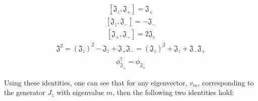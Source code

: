 \documentclass[10pt]{ucthesis}
\begin{document}
\begin{equation}
	\begin{aligned}
		[\mathfrak{J}_z,\mathfrak{J}_+] = \mathfrak{J}_+
	\end{aligned}
\end{equation} 
\begin{equation}
	\begin{aligned}
		[\mathfrak{J}_z,\mathfrak{J}_-] = -\mathfrak{J}_-
	\end{aligned}
\end{equation} 
\begin{equation}
	\begin{aligned}
		[\mathfrak{J}_+,\mathfrak{J}_-] = 2\mathfrak{J}_z
	\end{aligned}
\end{equation} 
\begin{equation}
	\begin{aligned}
		\mathfrak{J}^2 = (\mathfrak{J}_z)^2  -\mathfrak{J}_z +\mathfrak{J}_+\mathfrak{J}_- = (\mathfrak{J}_z)^2 +\mathfrak{J}_z+ \mathfrak{J}_-\mathfrak{J}_+
	\end{aligned}
\end{equation} 
\begin{equation}
	\begin{aligned}
		\phi_{\mathfrak{J}_\pm}^\dag = \phi_{\mathfrak{J}_\mp}
	\end{aligned}
\end{equation} 

Using these identities, one can see that for any eigenvector, $v_m$, corresponding to the generator $J_z$ with eigenvalue $m$, then the following two identities hold:
\end{document}

